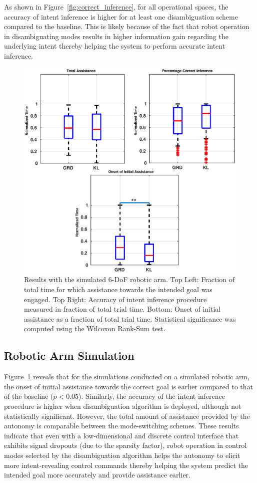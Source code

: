 \documentclass[letterpaper, 10 pt, conference]{ieeeconf}  %
\begin{document}
As shown in Figure~\ref{fig:correct_inference}, for all operational spaces, the accuracy of intent inference is higher for at least one disambiguation scheme compared to the baseline. This is likely because of the fact that robot operation in disambiguating modes results in higher information gain regarding the underlying intent thereby helping the system to perform accurate intent inference.
\begin{figure}[t]
	\centering
	\includegraphics[width= 1.\hsize, height=0.28\vsize, center]{./figures/mico_sim.eps}
	\vspace{-0.5cm}
	\caption{Results with the simulated 6-DoF robotic arm. Top Left: Fraction of total time for which assistance towards the intended goal was engaged. Top Right: Accuracy of intent inference procedure measured in fraction of total trial time. Bottom: Onset of initial assistance as a fraction of total trial time. Statistical significance was computed using the Wilcoxon Rank-Sum test. } 
	\label{fig:mico_results}
\end{figure}
\subsection{Robotic Arm Simulation}
Figure~\ref{fig:mico_results} reveals that for the simulations conducted on a simulated robotic arm, the onset of initial assistance towards the correct goal is earlier compared to that of the baseline ($p < 0.05$). Similarly, the accuracy of the intent inference procedure is higher when disambiguation algorithm is deployed, although not statistically significant. However, the total amount of assistance provided by the autonomy is comparable between the mode-switching schemes. These results indicate that even with a low-dimensional and discrete control interface that exhibits signal dropouts (due to the sparsity factor), robot operation in control modes selected by the disambiguation algorithm helps the autonomy to elicit more intent-revealing control commands thereby helping the system predict the intended goal more accurately and provide assistance earlier. 
\end{document}
